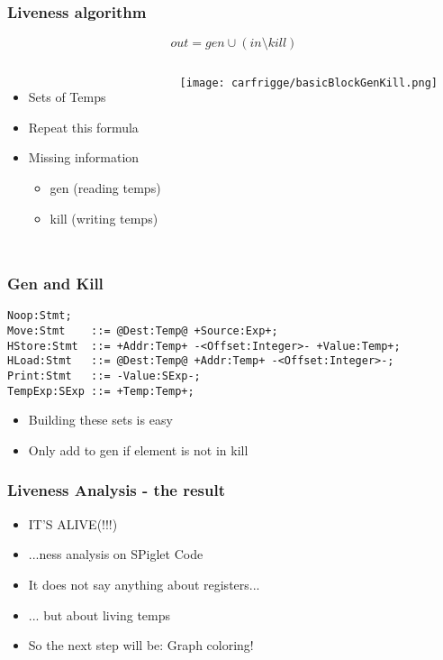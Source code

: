 \begin{frame}
    \frametitle{Liveness algorithm}
	\begin{figure}
		
	$$\textit{out} = gen \cup (in \setminus \textit{kill})$$
	\end{figure}
    \begin{columns}
        \begin{itemize} 
	\item Sets of Temps
	\item Repeat this formula
	\item Missing information
	\begin{itemize}
		\item gen (reading temps)
		\item kill (writing temps)
	\end{itemize}
	\end{itemize}
        \texttt{[image: carfrigge/basicBlockGenKill.png]} 
    \end{columns} 
\end{frame}

\begin{frame}[fragile]
    \frametitle{Gen and Kill}


\begin{lstlisting}[style=genAndKillStuff]
Noop:Stmt;
Move:Stmt    ::= @Dest:Temp@ +Source:Exp+;
HStore:Stmt  ::= +Addr:Temp+ -<Offset:Integer>- +Value:Temp+;
HLoad:Stmt   ::= @Dest:Temp@ +Addr:Temp+ -<Offset:Integer>-;
Print:Stmt   ::= -Value:SExp-;
TempExp:SExp ::= +Temp:Temp+;
\end{lstlisting}

\begin{itemize}
	 \item Building these sets is easy
	\onslide<2-> \item Only add to gen if element is not in kill
\end{itemize}
\end{frame}


\begin{frame}
    \frametitle{Liveness Analysis - the result}
	\begin{itemize}
		\item IT'S ALIVE(!!!)
		\onslide<2->\item ...ness analysis on SPiglet Code
		\onslide<3->\item It does not say anything about registers...
		\onslide<4->\item ... but about living temps
		\onslide<4-> \item So the next step will be: Graph coloring!
	\end{itemize}
\end{frame}
